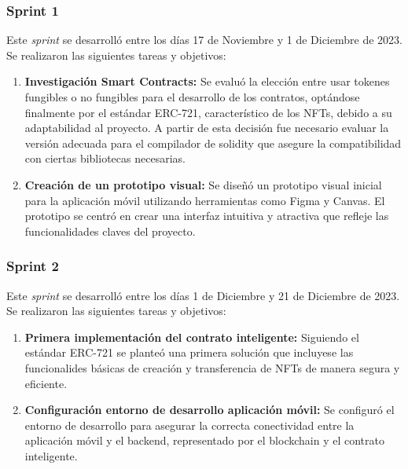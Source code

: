 \subsubsection{Sprint 1}

Este \textit{sprint} se desarrolló entre los días 17 de Noviembre y 1 de Diciembre de 2023. Se realizaron las siguientes tareas y objetivos:

\begin{enumerate}

\item \textbf{Investigación Smart Contracts:} Se evaluó la elección entre usar tokenes fungibles o no fungibles para el desarrollo de los contratos, optándose finalmente por el estándar ERC-721, característico de los NFTs, debido a su adaptabilidad al proyecto.
A partir de esta decisión fue necesario evaluar la versión adecuada para el compilador de solidity que asegure la compatibilidad con ciertas bibliotecas necesarias.

\item \textbf{Creación de un prototipo visual:} Se diseñó un prototipo visual inicial para la aplicación móvil utilizando herramientas como Figma y Canvas.
El prototipo se centró en crear una interfaz intuitiva y atractiva que refleje las funcionalidades claves del proyecto.

\end{enumerate}


\subsubsection{Sprint 2}

Este \textit{sprint} se desarrolló entre los días 1 de Diciembre y 21 de Diciembre de 2023. Se realizaron las siguientes tareas y objetivos:

\begin{enumerate}

\item \textbf{Primera implementación del contrato inteligente:} Siguiendo el estándar ERC-721 se planteó una primera solución que incluyese las funcionalides básicas de creación y transferencia de NFTs de manera segura y eficiente.

\item \textbf{Configuración entorno de desarrollo aplicación móvil:} Se configuró el entorno de desarrollo para asegurar la correcta conectividad entre la aplicación móvil y el backend, representado por el blockchain y el contrato inteligente.


\end{enumerate}


